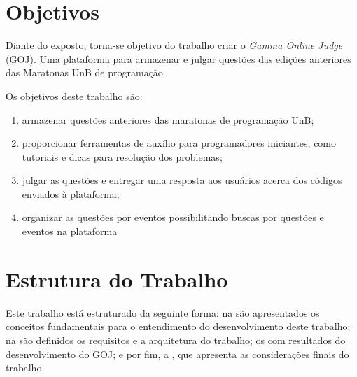 \section{Objetivos}
\label{sec:objetivos}

Diante do exposto, torna-se objetivo do trabalho criar o \textit{Gamma Online Judge} (GOJ). Uma plataforma para armazenar e julgar questões das edições anteriores das Maratonas UnB de programação.

Os objetivos deste trabalho são: 
\begin{enumerate}
    \item armazenar questões anteriores das maratonas de programação UnB;
    \item proporcionar ferramentas de auxílio para programadores iniciantes, como tutoriais e dicas para resolução dos problemas;
    \item julgar as questões e entregar uma resposta aos usuários acerca dos códigos enviados à plataforma;
    \item organizar as questões por eventos possibilitando buscas por questões e eventos na plataforma
\end{enumerate}

\section{Estrutura do Trabalho}
\label{sec:estruturaDoTrabalho}

Este trabalho está estruturado da seguinte forma: na  são apresentados os conceitos fundamentais para o entendimento do desenvolvimento deste trabalho; na  são definidos os requisitos e a arquitetura do trabalho; os  com resultados do desenvolvimento do GOJ; e por fim, a , que apresenta as considerações finais do trabalho.
